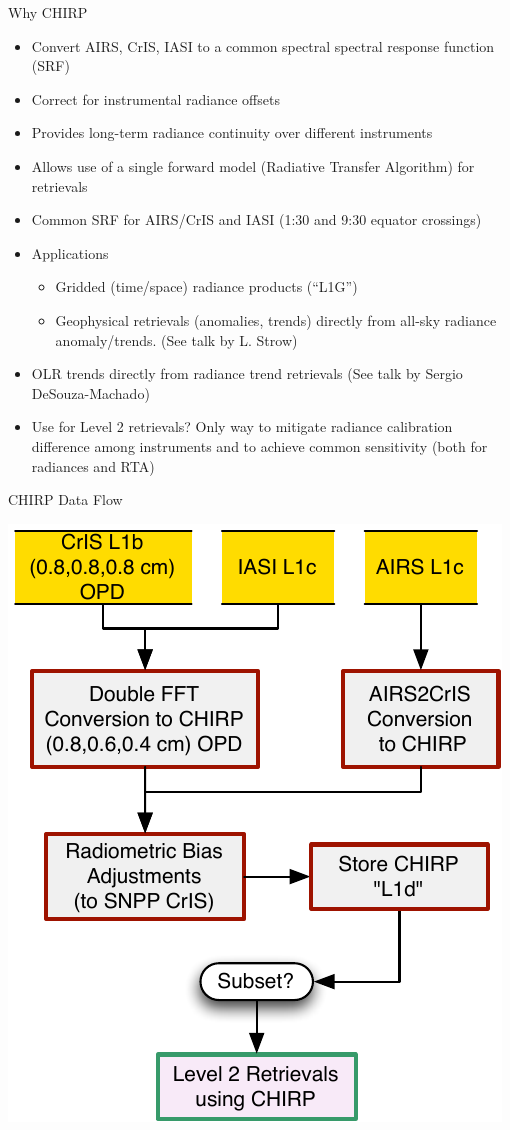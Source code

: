 \documentclass[10pt,t]{beamer}
\begin{document}
\begin{frame}[shrink=5,label={sec:orgd1ba206}]{Why CHIRP}
\vspace{-0.2in}

\begin{itemize}
\item Convert AIRS, CrIS, IASI to a common spectral spectral response function
(SRF)
\item Correct for instrumental radiance offsets
\item Provides long-term radiance continuity over different instruments
\item Allows use of a single forward model (Radiative Transfer Algorithm) for
retrievals
\item Common SRF for AIRS/CrIS and IASI (1:30 and 9:30 equator crossings)
\item Applications
\begin{itemize}
\item Gridded (time/space) radiance products (“L1G”)
\item Geophysical retrievals (anomalies, trends) directly from all-sky radiance  anomaly/trends.  (See talk by L. Strow)
\end{itemize}
\item OLR trends directly from radiance trend retrievals (See talk by Sergio
DeSouza-Machado)
\item Use for Level 2 retrievals?  Only way to mitigate radiance calibration
difference among instruments and to achieve common sensitivity (both for
radiances and RTA)
\end{itemize}
\end{frame}






\begin{frame}[label={sec:orgcb7f6ca}]{CHIRP Data Flow}
\vspace{-0.1in}

\begin{center}
\includegraphics[width=0.6\linewidth]{./Figs/Pdf/airs2cris_stm_talk1_small.pdf}
\end{center}
\end{frame}
\end{document}
